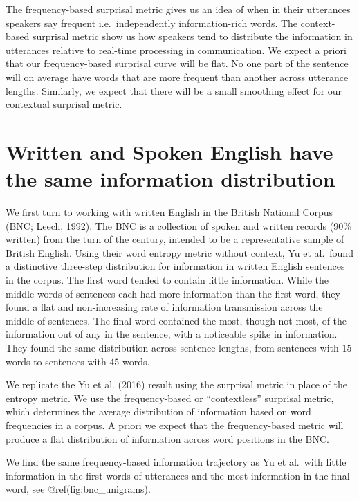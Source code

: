 \documentclass[man,floatsintext]{apa6}
\begin{document}
The frequency-based surprisal metric gives us an idea of when in their utterances speakers say frequent i.e.~independently information-rich words. The context-based surprisal metric show us how speakers tend to distribute the information in utterances relative to real-time processing in communication. We expect a priori that our frequency-based surprisal curve will be flat. No one part of the sentence will on average have words that are more frequent than another across utterance lengths. Similarly, we expect that there will be a small smoothing effect for our contextual surprisal metric.

\hypertarget{written-and-spoken-english-have-the-same-information-distribution}{%
\section{Written and Spoken English have the same information distribution}\label{written-and-spoken-english-have-the-same-information-distribution}}

We first turn to working with written English in the British National Corpus (BNC; Leech, 1992). The BNC is a collection of spoken and written records (90\% written) from the turn of the century, intended to be a representative sample of British English. Using their word entropy metric without context, Yu et al.~found a distinctive three-step distribution for information in written English sentences in the corpus. The first word tended to contain little information. While the middle words of sentences each had more information than the first word, they found a flat and non-increasing rate of information transmission across the middle of sentences. The final word contained the most, though not most, of the information out of any in the sentence, with a noticeable spike in information. They found the same distribution across sentence lengths, from sentences with \(15\) words to sentences with \(45\) words.

We replicate the Yu et al. (2016) result using the surprisal metric in place of the entropy metric. We use the frequency-based or \enquote{contextless} surprisal metric, which determines the average distribution of information based on word frequencies in a corpus. A priori we expect that the frequency-based metric will produce a flat distribution of information across word positions in the BNC.

We find the same frequency-based information trajectory as Yu et al.~with little information in the first words of utterances and the most information in the final word, see @ref(fig:bnc\_unigrams).
\end{document}
